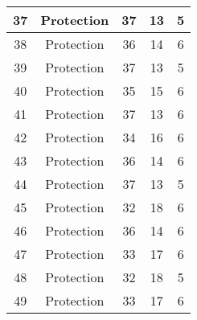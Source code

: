 \documentclass[results.tex]{subfiles}
\begin{document}
\begin{center}
\begin{tabular}{| c || c | c | c | c |}
            \hline
            37                      & Protection                   & 37                     & 13                      & 5                    \\
            \hline
            38                      & Protection                   & 36                     & 14                      & 6                    \\
            \hline
            39                      & Protection                   & 37                     & 13                      & 5                    \\
            \hline
            40                      & Protection                   & 35                     & 15                      & 6                    \\
            \hline
            41                      & Protection                   & 37                     & 13                      & 6                    \\
            \hline
            42                      & Protection                   & 34                     & 16                      & 6                    \\
            \hline
            43                      & Protection                   & 36                     & 14                      & 6                    \\
            \hline
            44                      & Protection                   & 37                     & 13                      & 5                    \\
            \hline
            45                      & Protection                   & 32                     & 18                      & 6                    \\
            \hline
            46                      & Protection                   & 36                     & 14                      & 6                    \\
            \hline
            47                      & Protection                   & 33                     & 17                      & 6                    \\
            \hline
            48                      & Protection                   & 32                     & 18                      & 5                    \\
            \hline
            49                      & Protection                   & 33                     & 17                      & 6                    \\
            \hline
        \end{tabular}
    \end{center}
\end{document}

